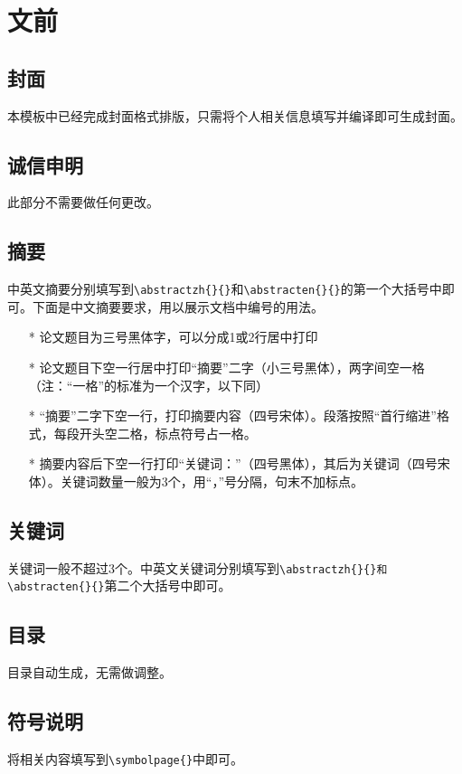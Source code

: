 \documentclass{bucthesis}
\begin{document}
\section{文前}
\subsection{封面}{\par
	本模板中已经完成封面格式排版，只需将个人相关信息填写并编译即可生成封面。}
\subsection{诚信申明}{\par
	此部分不需要做任何更改。}
\subsection{摘要}{\par
	中英文摘要分别填写到\verb|\abstractzh{}{}|和\verb|\abstracten{}{}|的第一个大括号中即可。下面是中文摘要要求，用以展示文档中编号的用法。
	\begin{itemize}
		\item[*] 论文题目为三号黑体字，可以分成1或2行居中打印
		\item[*] 论文题目下空一行居中打印“摘要”二字（小三号黑体），两字间空一格（注：“一格”的标准为一个汉字，以下同）
		\item[*] “摘要”二字下空一行，打印摘要内容（四号宋体）。段落按照“首行缩进”格式，每段开头空二格，标点符号占一格。
		\item[*] 摘要内容后下空一行打印“关键词：”（四号黑体），其后为关键词（四号宋体）。关键词数量一般为3个，用“，”号分隔，句末不加标点。
	\end{itemize}
}

\subsection{关键词}{\par
	关键词一般不超过3个。中英文关键词分别填写到\verb|\abstractzh{}{}和\abstracten{}{}|第二个大括号中即可。}
\subsection{目录}{\par
	目录自动生成，无需做调整。}
\subsection{符号说明}{\par
	将相关内容填写到\verb|\symbolpage{}|中即可。}
\end{document}
